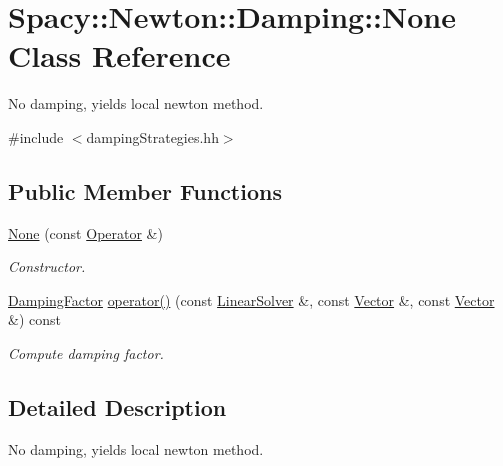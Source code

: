 \hypertarget{classSpacy_1_1Newton_1_1Damping_1_1None}{}\section{Spacy\+:\+:Newton\+:\+:Damping\+:\+:None Class Reference}
\label{classSpacy_1_1Newton_1_1Damping_1_1None}


No damping, yields local newton method.  




{\ttfamily \#include $<$damping\+Strategies.\+hh$>$}

\subsection*{Public Member Functions}
\begin{DoxyCompactItemize}
\item 
\hypertarget{classSpacy_1_1Newton_1_1Damping_1_1None_a76bdbc09dbc04ef03f7b95259233abc0}{}\hyperlink{classSpacy_1_1Newton_1_1Damping_1_1None_a76bdbc09dbc04ef03f7b95259233abc0}{None} (const \hyperlink{group__SpacyGroup_ga3f89622eba80cf840b2a7102f1303455_ga3f89622eba80cf840b2a7102f1303455}{Operator} \&)\label{classSpacy_1_1Newton_1_1Damping_1_1None_a76bdbc09dbc04ef03f7b95259233abc0}

\begin{DoxyCompactList}\small\item\em Constructor. \end{DoxyCompactList}\item 
\hyperlink{classSpacy_1_1DampingFactor}{Damping\+Factor} \hyperlink{classSpacy_1_1Newton_1_1Damping_1_1None_ae34a351117af3a0dd753eef541a5c0eb_ae34a351117af3a0dd753eef541a5c0eb}{operator()} (const \hyperlink{namespaceSpacy_a7d5cd1c6fb9dd85aa345b536caf30bba_a7d5cd1c6fb9dd85aa345b536caf30bba}{Linear\+Solver} \&, const \hyperlink{classSpacy_1_1Vector}{Vector} \&, const \hyperlink{classSpacy_1_1Vector}{Vector} \&) const 
\begin{DoxyCompactList}\small\item\em Compute damping factor. \end{DoxyCompactList}\end{DoxyCompactItemize}


\subsection{Detailed Description}
No damping, yields local newton method. 

